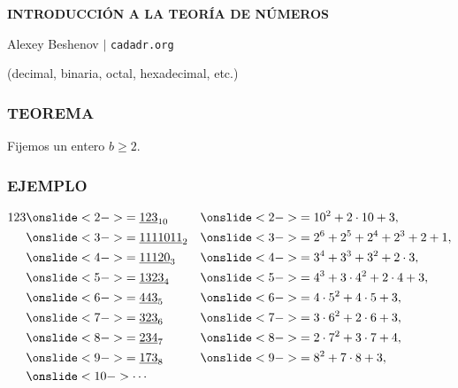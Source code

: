 



\begin{frame}
  \textbf{INTRODUCCIÓN A LA TEORÍA DE NÚMEROS}

  Alexey Beshenov $\mid$ \texttt{cadadr.org}

  \vfill

  \begin{center}

    \large (decimal, binaria, octal, hexadecimal, etc.)
  \end{center}

  \vfill
\end{frame}

\begin{frame}
  \frametitle{TEOREMA}

  \begin{framed}
    Fijemos un entero $b \ge 2$.

  \end{framed}

\end{frame}

\begin{frame}
  \frametitle{EJEMPLO}

  \begin{align*}
    123 & \onslide<2->{= \underline{123}_{10}} && \onslide<2->{= 10^2 + 2\cdot 10 + 3,} \\
        & \onslide<3->{= \underline{1111011}_2} && \onslide<3->{= 2^6 + 2^5 + 2^4 + 2^3 + 2 + 1,} \\
        & \onslide<4->{= \underline{11120}_3} && \onslide<4->{= 3^4 + 3^3 + 3^2 + 2\cdot 3,} \\
        & \onslide<5->{= \underline{1323}_4} && \onslide<5->{= 4^3 + 3\cdot 4^2 + 2\cdot 4 + 3,} \\
        & \onslide<6->{= \underline{443}_5} && \onslide<6->{= 4\cdot 5^2 + 4\cdot 5 + 3,} \\
        & \onslide<7->{= \underline{323}_6} && \onslide<7->{= 3\cdot 6^2 + 2\cdot 6 + 3,} \\
        & \onslide<8->{= \underline{234}_7} && \onslide<8->{= 2\cdot 7^2 + 3\cdot 7 + 4,} \\
        & \onslide<9->{= \underline{173}_8} && \onslide<9->{= 8^2 + 7\cdot 8 + 3,} \\
        & \onslide<10->{\cdots}
  \end{align*}
\end{frame}

